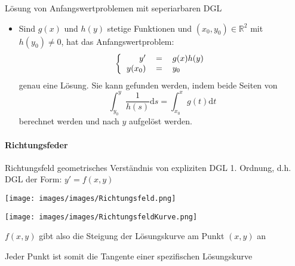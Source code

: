\begin{KR}{Lösung von Anfangswertproblemen mit seperiarbaren DGL}
  \begin{itemize}
    \item Sind \(g(x)\) und \(h(y)\) stetige Funktionen und \((x_0,y_0)\in \mathbb{R}^2\) mit \(h(y_0)\neq 0\), hat das
      Anfangswertproblem:
      \[\left\{\begin{tabular}{rcl}
	  \(y'\)&\(=\)&\(g(x)h(y)\)\\
	  \(y(x_0)\)&\(=\)&\(y_0\)\\
      \end{tabular}\right.\]
      genau eine Lösung. Sie kann gefunden werden, indem beide Seiten von 
      \[\int_{y_0}^{y}{\frac{1}{h(s)}\mathrm{d}s}=\int_{x_0}^{x}{g(t)\mathrm{d}t}\]
      berechnet werden und nach \(y\) aufgelöst werden.
  \end{itemize}
\end{KR}

\paragraph{Richtungsfeder}
\begin{definition}{Richtungsfeld} geometrisches Verständnis von expliziten DGL 1. Ordnung, d.h. DGL der Form:
  $y'=f(x,y)$
  \begin{minipage}{0.45\linewidth}
    \begin{center}
    \texttt{[image: images/images/Richtungsfeld.png]}
    \end{center}
  \end{minipage}
  \hspace{3mm}
  \begin{minipage}{0.45\linewidth}
    \begin{center}
    \texttt{[image: images/images/RichtungsfeldKurve.png]}
    \end{center}
  \end{minipage}

  \begin{minipage}{0.45\linewidth}
    \(f(x,y)\) gibt also die Steigung der Lösungskurve am Punkt \((x,y)\) an
  \end{minipage}
  \hspace{3mm}
  \begin{minipage}{0.45\linewidth}
    Jeder Punkt ist somit die Tangente einer spezifischen Lösungskurve
  \end{minipage}
\end{definition}

